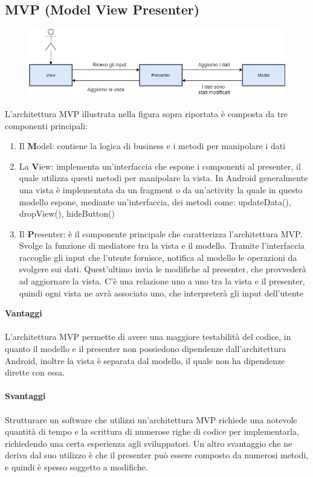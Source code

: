 \documentclass[12pt]{report}
\begin{document}
\subsection{MVP (Model View Presenter)}
\begin{figure}[H]
	\centering
	\includegraphics[width=0.7\linewidth]{immagini/mvp}
	\caption{}
	\label{fig:mvc}
\end{figure}
L'architettura MVP illustrata nella figura sopra riportata è composta da tre componenti principali:
\begin{enumerate}
	\item Il \textbf{M}odel: contiene la logica di business e i metodi per manipolare i dati %
	\item La \textbf{V}iew: implementa un'interfaccia che espone i componenti al presenter, il quale utilizza questi metodi per manipolare la vista. In Android generalmente una vista è implementata da un fragment o da un'activity la quale in questo modello espone, mediante un'interfaccia, dei metodi come: updateData(), dropView(), hideButton()
	\item Il \textbf{P}resenter: è il componente principale che caratterizza l'architettura MVP. Svolge la funzione di mediatore tra la vista e il modello. Tramite l'interfaccia raccoglie gli input che l'utente fornisce, notifica al modello le operazioni da svolgere sui dati. Quest'ultimo invia le modifiche al presenter, che provvederà ad aggiornare la vista. C'è una relazione uno a uno tra la vista e il presenter, quindi ogni vista ne avrà associato uno, che interpreterà gli input dell'utente
\end{enumerate}
\textbf{Vantaggi}\\\\
L'architettura MVP permette di avere una maggiore testabilità del codice, in quanto il modello e il presenter non possiedono dipendenze dall'architettura Android, inoltre la vista è separata dal modello, il quale non ha dipendenze dirette con essa.
\\
\\\textbf{Svantaggi}\\\\
Strutturare un software che utilizzi un'architettura MVP richiede una notevole quantità di tempo e la scrittura di numerose righe di codice per implementarla, richiedendo una certa esperienza agli sviluppatori. Un altro svantaggio che ne deriva dal suo utilizzo è che il presenter può essere composto da numerosi metodi, e quindi è spesso soggetto a modifiche.
\end{document}
